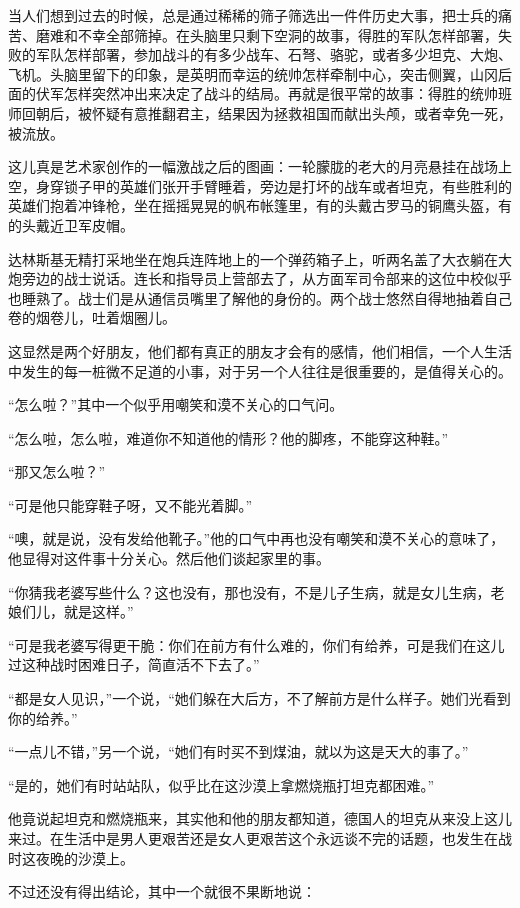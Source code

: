 当人们想到过去的时候，总是通过稀稀的筛子筛选出一件件历史大事，把士兵的痛苦、磨难和不幸全部筛掉。在头脑里只剩下空洞的故事，得胜的军队怎样部署，失败的军队怎样部署，参加战斗的有多少战车、石弩、骆驼，或者多少坦克、大炮、飞机。头脑里留下的印象，是英明而幸运的统帅怎样牵制中心，突击侧翼，山冈后面的伏军怎样突然冲出来决定了战斗的结局。再就是很平常的故事：得胜的统帅班师回朝后，被怀疑有意推翻君主，结果因为拯救祖国而献出头颅，或者幸免一死，被流放。

这儿真是艺术家创作的一幅激战之后的图画：一轮朦胧的老大的月亮悬挂在战场上空，身穿锁子甲的英雄们张开手臂睡着，旁边是打坏的战车或者坦克，有些胜利的英雄们抱着冲锋枪，坐在摇摇晃晃的帆布帐篷里，有的头戴古罗马的铜鹰头盔，有的头戴近卫军皮帽。

达林斯基无精打采地坐在炮兵连阵地上的一个弹药箱子上，听两名盖了大衣躺在大炮旁边的战士说话。连长和指导员上营部去了，从方面军司令部来的这位中校似乎也睡熟了。战士们是从通信员嘴里了解他的身份的。两个战士悠然自得地抽着自己卷的烟卷儿，吐着烟圈儿。

这显然是两个好朋友，他们都有真正的朋友才会有的感情，他们相信，一个人生活中发生的每一桩微不足道的小事，对于另一个人往往是很重要的，是值得关心的。

“怎么啦？”其中一个似乎用嘲笑和漠不关心的口气问。

“怎么啦，怎么啦，难道你不知道他的情形？他的脚疼，不能穿这种鞋。”

“那又怎么啦？”

“可是他只能穿鞋子呀，又不能光着脚。”

“噢，就是说，没有发给他靴子。”他的口气中再也没有嘲笑和漠不关心的意味了，他显得对这件事十分关心。然后他们谈起家里的事。

“你猜我老婆写些什么？这也没有，那也没有，不是儿子生病，就是女儿生病，老娘们儿，就是这样。”

“可是我老婆写得更干脆：你们在前方有什么难的，你们有给养，可是我们在这儿过这种战时困难日子，简直活不下去了。”

“都是女人见识，”一个说，“她们躲在大后方，不了解前方是什么样子。她们光看到你的给养。”

“一点儿不错，”另一个说，“她们有时买不到煤油，就以为这是天大的事了。”

“是的，她们有时站站队，似乎比在这沙漠上拿燃烧瓶打坦克都困难。”

他竟说起坦克和燃烧瓶来，其实他和他的朋友都知道，德国人的坦克从来没上这儿来过。在生活中是男人更艰苦还是女人更艰苦这个永远谈不完的话题，也发生在战时这夜晚的沙漠上。

不过还没有得出结论，其中一个就很不果断地说：


